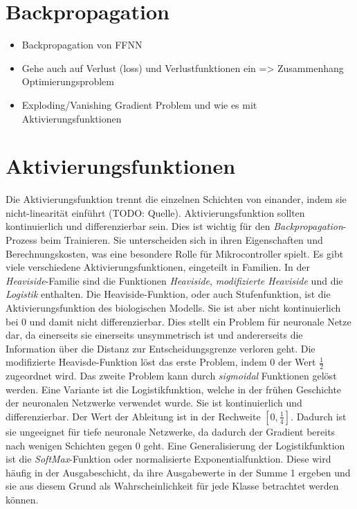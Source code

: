 \section{Backpropagation}
\begin{itemize}
    \item Backpropagation von FFNN
    \item Gehe auch auf Verlust (loss) und Verlustfunktionen ein => Zusammenhang Optimierungsproblem
    \item Exploding/Vanishing Gradient Problem und wie es mit Aktivierungsfunktionen
\end{itemize}

\section{Aktivierungsfunktionen}
Die Aktivierungsfunktion trennt die einzelnen Schichten von einander, indem sie nicht-linearität einführt (TODO: Quelle).
Aktivierungsfunktion sollten kontinuierlich und differenzierbar sein.
Dies ist wichtig für den \textit{Backpropagation}-Prozess beim Trainieren.
Sie unterscheiden sich in ihren Eigenschaften und Berechnungskosten, was eine besondere Rolle für Mikrocontroller spielt.
Es gibt viele verschiedene Aktivierungsfunktionen, eingeteilt in Familien.
\newline
\newline
In der \textit{Heaviside}-Familie sind die Funktionen \textit{Heaviside}, \textit{modifizierte Heaviside} und die \textit{Logistik} enthalten.
Die Heaviside-Funktion, oder auch Stufenfunktion, ist die Aktivierungsfunktion des biologischen Modells.
Sie ist aber nicht kontinuierlich bei 0 und damit nicht differenzierbar.
Dies stellt ein Problem für neuronale Netze dar, da einerseits sie einerseits unsymmetrisch ist und andererseits die Information über die Distanz zur Entscheidungsgrenze verloren geht.
Die modifizierte Heavisde-Funktion löst das erste Problem, indem 0 der Wert $\frac{1}{2}$ zugeordnet wird.
Das zweite Problem kann durch \textit{sigmoidal} Funktionen gelöst werden.
Eine Variante ist die Logistikfunktion, welche in der frühen Geschichte der neuronalen Netzwerke verwendet wurde.
Sie ist kontinuierlich und differenzierbar. Der Wert der Ableitung ist in der Rechweite $[0, \frac{1}{4}]$.
Dadurch ist sie ungeeignet für tiefe neuronale Netzwerke, da dadurch der Gradient bereits nach wenigen Schichten gegen 0 geht.
Eine Generalisierung der Logistikfunktion ist die \textit{SoftMax}-Funktion oder normalisierte Exponentialfunktion.
Diese wird häufig in der Ausgabeschicht, da ihre Ausgabewerte in der Summe 1 ergeben und sie aus diesem Grund als Wahrscheinlichkeit für jede Klasse betrachtet werden können.
